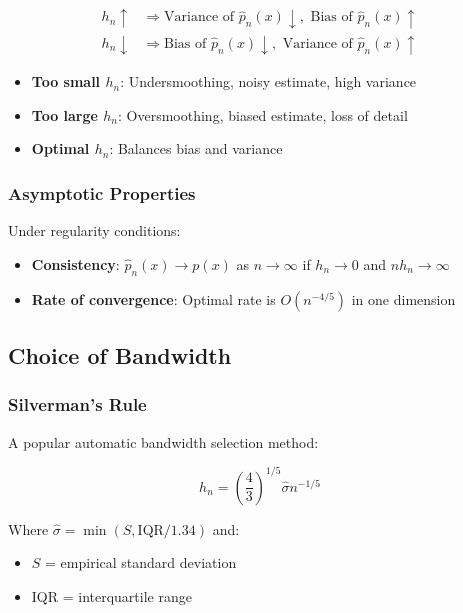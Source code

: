 \documentclass[12pt,a4paper]{article}
\begin{document}
\begin{align}
h_n \uparrow &\Rightarrow \text{Variance of } \hat{p}_n(x) \downarrow, \text{ Bias of } \hat{p}_n(x) \uparrow \\
h_n \downarrow &\Rightarrow \text{Bias of } \hat{p}_n(x) \downarrow, \text{ Variance of } \hat{p}_n(x) \uparrow
\end{align}

\begin{tcolorbox}[colback=red!5!white,colframe=red!75!black,title=Bandwidth Effects]
\begin{itemize}
    \item \textbf{Too small $h_n$}: Undersmoothing, noisy estimate, high variance
    \item \textbf{Too large $h_n$}: Oversmoothing, biased estimate, loss of detail
    \item \textbf{Optimal $h_n$}: Balances bias and variance
\end{itemize}
\end{tcolorbox}

\subsubsection{Asymptotic Properties}

Under regularity conditions:
\begin{itemize}
    \item \textbf{Consistency}: $\hat{p}_n(x) \to p(x)$ as $n \to \infty$ if $h_n \to 0$ and $nh_n \to \infty$
    \item \textbf{Rate of convergence}: Optimal rate is $O(n^{-4/5})$ in one dimension
\end{itemize}

\subsection{Choice of Bandwidth}

\subsubsection{Silverman's Rule}

A popular automatic bandwidth selection method:

\begin{equation}
h_n = \left(\frac{4}{3}\right)^{1/5} \hat{\sigma} n^{-1/5}
\end{equation}

Where $\hat{\sigma} = \min(S, \text{IQR}/1.34)$ and:
\begin{itemize}
    \item $S$ = empirical standard deviation
    \item IQR = interquartile range
\end{itemize}
\end{document}
